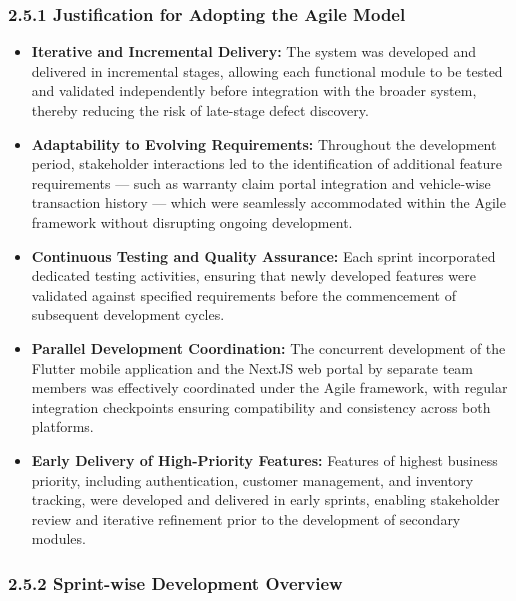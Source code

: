 \documentclass[12pt, oneside]{article}
\begin{document}
\subsubsection*{2.5.1 Justification for Adopting the Agile Model}
\begin{itemize}
    \item \textbf{Iterative and Incremental Delivery:} The system was developed and delivered in incremental stages, allowing each functional module to be tested and validated independently before integration with the broader system, thereby reducing the risk of late-stage defect discovery.
    \item \textbf{Adaptability to Evolving Requirements:} Throughout the development period, stakeholder interactions led to the identification of additional feature requirements — such as warranty claim portal integration and vehicle-wise transaction history — which were seamlessly accommodated within the Agile framework without disrupting ongoing development.
    \item \textbf{Continuous Testing and Quality Assurance:} Each sprint incorporated dedicated testing activities, ensuring that newly developed features were validated against specified requirements before the commencement of subsequent development cycles.
    \item \textbf{Parallel Development Coordination:} The concurrent development of the Flutter mobile application and the NextJS web portal by separate team members was effectively coordinated under the Agile framework, with regular integration checkpoints ensuring compatibility and consistency across both platforms.
    \item \textbf{Early Delivery of High-Priority Features:} Features of highest business priority, including authentication, customer management, and inventory tracking, were developed and delivered in early sprints, enabling stakeholder review and iterative refinement prior to the development of secondary modules.
\end{itemize}

\vspace{0.5em}
\subsubsection*{2.5.2 Sprint-wise Development Overview}
\end{document}

